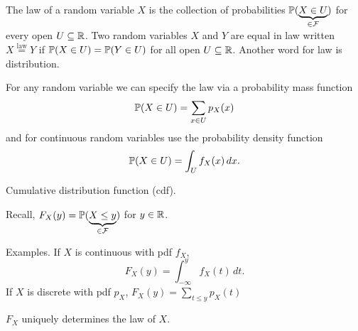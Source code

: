 \documentclass[10pt, a4paper]{article}
\begin{document}
The law of a random variable $X$ is the collection of probabilities $\P(\underbrace{X \in U}_{\in \mathcal{F}})$ for every open $U \subseteq \R$.
Two random variables $X$ and $Y$ are equal in law written $X \overset{\text{law}}{=} Y$ if $\P(X \in U) = \P(Y \in U)$ for all open $U \subseteq \R$.
Another word for law is distribution.

For any random variable we can specify the law via a probability mass function
\[
\P(X \in U) = \sum_{x \in U}p_{X}(x)
\]
and for continuous random variables use the probability density function
\[
\P(X \in U) = \int_{U}f_{X}(x)\,dx.
\]

Cumulative distribution function
(cdf).

Recall,
$F_{X}(y) = \P(\underbrace{X \leq y}_{\in \mathcal{F}})$ for $y \in \R$.

Examples.
If $X$ is continuous with pdf $f_{X}$,
\[
F_{X}(y) = \int_{-\infty}^{y}f_{X}(t)\,dt.
\]
If $X$ is discrete with pdf $p_{X}$,
$F_{X}(y) = \sum_{t \leq y}p_{X}(t)$

$F_{X}$ uniquely determines the law of $X$.
\end{document}
